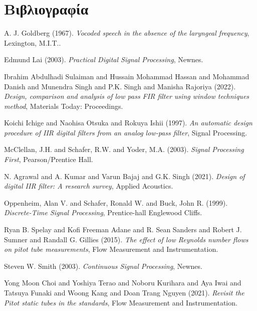 \documentclass[breaklines=true, 12pt]{article}
\begin{document}
\section{Βιβλιογραφία}
\label{sec:org8a2d876}
\noindent
A. J. Goldberg (1967). \emph{Vocoded speech in the absence of the laryngeal frequency}, Lexington, M.I.T..

\noindent
Edmund Lai (2003). \emph{Practical Digital Signal Processing}, Newnes.

\noindent
Ibrahim Abdulhadi Sulaiman and Hussain Mohammad Hassan and Mohammad Danish and Munendra Singh and P.K. Singh and Manisha Rajoriya (2022). \emph{Design, comparison and analysis of low pass FIR filter using window techniques method}, Materials Today: Proceedings.

\noindent
Koichi Ichige and Naohisa Otsuka and Rokuya Ishii (1997). \emph{An automatic design procedure of IIR digital filters from an analog low-pass filter}, Signal Processing.

\noindent
McClellan, J.H. and Schafer, R.W. and Yoder, M.A. (2003). \emph{Signal Processing First}, Pearson/Prentice Hall.

\noindent
N. Agrawal and A. Kumar and Varun Bajaj and G.K. Singh (2021). \emph{Design of digital IIR filter: A research survey}, Applied Acoustics.

\noindent
Oppenheim, Alan V. and Schafer, Ronald W. and Buck, John R. (1999). \emph{Discrete-Time Signal Processing}, Prentice-hall Englewood Cliffs.

\noindent
Ryan B. Spelay and Kofi Freeman Adane and R. Sean Sanders and Robert J. Sumner and Randall G. Gillies (2015). \emph{The effect of low Reynolds number flows on pitot tube measurements}, Flow Measurement and Instrumentation.

\noindent
Steven W. Smith (2003). \emph{Continuous Signal Processing}, Newnes.

\noindent
Yong Moon Choi and Yoshiya Terao and Noboru Kurihara and Aya Iwai and Tatsuya Funaki and Woong Kang and Doan Trang Nguyen (2021). \emph{Revisit the Pitot static tubes in the standards}, Flow Measurement and Instrumentation.
\end{document}
